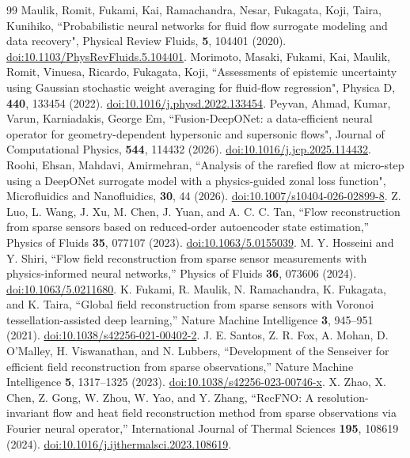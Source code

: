 \documentclass[aip,pof,preprint,notitlepage,floatfix,amsmath,amssymb]{revtex4-2}
\begin{document}
\begin{thebibliography}{99}
 Maulik, Romit, Fukami, Kai, Ramachandra, Nesar, Fukagata, Koji, Taira, Kunihiko, ``Probabilistic neural networks for fluid flow surrogate modeling and data recovery", Physical Review Fluids, \textbf{5}, 104401 (2020). \href{https://doi.org/10.1103/PhysRevFluids.5.104401}{doi:10.1103/PhysRevFluids.5.104401}.
 Morimoto, Masaki, Fukami, Kai, Maulik, Romit, Vinuesa, Ricardo, Fukagata, Koji, ``Assessments of epistemic uncertainty using Gaussian stochastic weight averaging for fluid-flow regression", Physica D, \textbf{440}, 133454 (2022). \href{https://doi.org/10.1016/j.physd.2022.133454}{doi:10.1016/j.physd.2022.133454}.
 Peyvan, Ahmad, Kumar, Varun, Karniadakis, George Em, ``Fusion-DeepONet: a data-efficient neural operator for geometry-dependent hypersonic and supersonic flows", Journal of Computational Physics, \textbf{544}, 114432 (2026). \href{https://doi.org/10.1016/j.jcp.2025.114432}{doi:10.1016/j.jcp.2025.114432}.
 Roohi, Ehsan, Mahdavi, Amirmehran, ``Analysis of the rarefied flow at micro-step using a DeepONet surrogate model with a physics-guided zonal loss function", Microfluidics and Nanofluidics, \textbf{30}, 44 (2026). \href{https://doi.org/10.1007/s10404-026-02899-8}{doi:10.1007/s10404-026-02899-8}.
 Z. Luo, L. Wang, J. Xu, M. Chen, J. Yuan, and A. C. C. Tan, ``Flow reconstruction from sparse sensors based on reduced-order autoencoder state estimation,'' Physics of Fluids \textbf{35}, 077107 (2023). \href{https://doi.org/10.1063/5.0155039}{doi:10.1063/5.0155039}.
 M. Y. Hosseini and Y. Shiri, ``Flow field reconstruction from sparse sensor measurements with physics-informed neural networks,'' Physics of Fluids \textbf{36}, 073606 (2024). \href{https://doi.org/10.1063/5.0211680}{doi:10.1063/5.0211680}.
 K. Fukami, R. Maulik, N. Ramachandra, K. Fukagata, and K. Taira, ``Global field reconstruction from sparse sensors with Voronoi tessellation-assisted deep learning,'' Nature Machine Intelligence \textbf{3}, 945--951 (2021). \href{https://doi.org/10.1038/s42256-021-00402-2}{doi:10.1038/s42256-021-00402-2}.
 J. E. Santos, Z. R. Fox, A. Mohan, D. O'Malley, H. Viswanathan, and N. Lubbers, ``Development of the Senseiver for efficient field reconstruction from sparse observations,'' Nature Machine Intelligence \textbf{5}, 1317--1325 (2023). \href{https://doi.org/10.1038/s42256-023-00746-x}{doi:10.1038/s42256-023-00746-x}.
 X. Zhao, X. Chen, Z. Gong, W. Zhou, W. Yao, and Y. Zhang, ``RecFNO: A resolution-invariant flow and heat field reconstruction method from sparse observations via Fourier neural operator,'' International Journal of Thermal Sciences \textbf{195}, 108619 (2024). \href{https://doi.org/10.1016/j.ijthermalsci.2023.108619}{doi:10.1016/j.ijthermalsci.2023.108619}.

\end{thebibliography}
\end{document}
